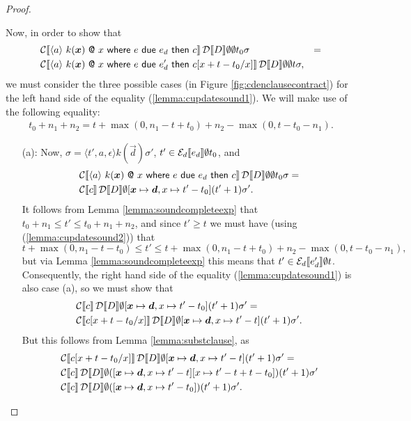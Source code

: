 \documentclass[orivec,final]{llncs-href}
\makeatletter
\newcommand{\trace}{\sigma}
\newcommand{\emptychoice}{\epsilon}
\newcommand{\event}[3]{\langle #1,#2,#3\rangle}
\newcommand{\catomic}[6]{\langle#1\rangle\ #2\ \textsf{@}\ #3\
  \mathsf{where}\ #4\ \mathsf{due}\ #5\ \mathsf{then}\ #6}
\makeatother
\begin{document}
\begin{proof}
\begin{itemize}[]
    Now, in order to show that
    \begin{align}
      &\cdenclause{\catomic{a}{k(\vec{x})}{x}{e}{e_d}{c}}{\cdencontext{D}}{\emptyset}{\emptyset}{t_0}{\trace}
      &=\label{lemma:cupdatesound1}\\
      &\cdenclause{\catomic{a}{k(\vec{x})}{x}{e}{e_d'}{c[x+t-t_0/x]}}{\cdencontext{D}}{\emptyset}{\emptyset}{t}{\trace},\notag
    \end{align}
    we must consider the three possible cases (in Figure
    \ref{fig:cdenclausecontract}) for the left hand side of the
    equality (\ref{lemma:cupdatesound1}). We will make use of the
    following equality:
    \begin{align}
      t_0 + n_1 + n_2 = t+\max(0,n_1-t+t_0) + n_2 -
      \max(0,t-t_0-n_1).\label{lemma:cupdatesound2}
    \end{align}
    \begin{itemize}
    \item[(a):] Now, $\trace =
      \event{t'}{a}{\emptychoice}{k(\vec{d})}\trace'$, $t' \in
      \mathcal{E}_d\llbracket e_d \rrbracket \emptyset t_0$, and
      \begin{align*}
        &\cdenclause{\catomic{a}{k(\vec{x})}{x}{e}{e_d}{c}}{\cdencontext{D}}{\emptyset}{\emptyset}{t_0}{\trace}
        =\\
        &\cdenclause{c}{\cdencontext{D}}{\emptyset}{[\vec{x} \mapsto
          \vec{d},x \mapsto t'-t_0]}{(t'+1)}{\trace'}.
      \end{align*}
      It follows from Lemma \ref{lemma:soundcompleteexp} that $t_0 +
      n_1 \leq t' \leq t_0 + n_1 + n_2$, and since $t' \geq t$ we must
      have (using (\ref{lemma:cupdatesound2})) that
      \[
      t + \max(0,n_1-t-t_0) \leq t' \leq t + \max(0,n_1-t+t_0) + n_2 -
      \max(0,t-t_0-n_1),
      \]
      but via Lemma \ref{lemma:soundcompleteexp} this means that $t' \in
      \mathcal{E}_d\llbracket e_d' \rrbracket \emptyset t$. Consequently, the right hand
      side of the equality (\ref{lemma:cupdatesound1}) is also case
      (a), so we must show that
      \begin{align*}
        &\cdenclause{c}{\cdencontext{D}}{\emptyset}{[\vec{x} \mapsto
          \vec{d},x \mapsto t'-t_0]}{(t'+1)}{\trace'} =\\
        &\cdenclause{c[x+t-t_0/x]}{\cdencontext{D}}{\emptyset}{[\vec{x} \mapsto
          \vec{d},x \mapsto t'-t]}{(t'+1)}{\trace'}.
      \end{align*}
      But this follows from Lemma \ref{lemma:substclause}, as
      \begin{align*}
        &\cdenclause{c[x+t-t_0/x]}{\cdencontext{D}}{\emptyset}{[\vec{x}
          \mapsto \vec{d},x \mapsto t'-t]}{(t'+1)}{\trace'} =\\
        &\cdenclause{c}{\cdencontext{D}}{\emptyset}{([\vec{x}
          \mapsto \vec{d},x \mapsto t'-t][x \mapsto
          t'-t+t-t_0])}{(t'+1)}{\trace'}\\
        &\cdenclause{c}{\cdencontext{D}}{\emptyset}{([\vec{x}
          \mapsto \vec{d},x \mapsto
          t'-t_0])}{(t'+1)}{\trace'}.
      \end{align*}


\end{itemize}
\end{itemize}
\end{proof}
\end{document}
